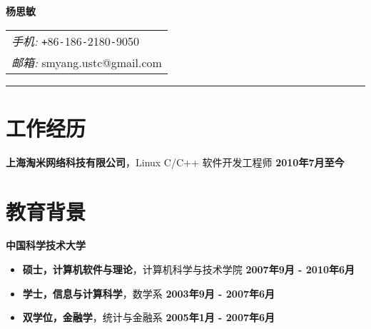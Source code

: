 \documentclass[margin]{res}
\newcommand{\ustc}{中国科学技术大学}
\newcommand{\taomee}{上海淘米网络科技有限公司}
\begin{document}
{\bfseries \huge 杨思敏}
\hfill
\begin{tabular}{l}
    \textit{手机: } \texttt{+}86\texttt{-}186\texttt{-}2180\texttt{-}9050\\
    \textit{邮箱: }{smyang.ustc@gmail.com}
\end{tabular}
\rule{\columnwidth}{1pt}

\section{工作经历}
{\bf \taomee}，Linux C/C++ 软件开发工程师 \hfill {\bf 2010年7月至今}\\[1mm]

\section{教育背景}
{\bf \ustc}\\[1mm]
\begin{itemize}
    \item {\bf 硕士，计算机软件与理论}，计算机科学与技术学院 \hfill {\bf 2007年9月 - 2010年6月}
    \item {\bf 学士，信息与计算科学}，数学系 \hfill{\bf 2003年9月 - 2007年6月}
    \item {\bf 双学位，金融学}，统计与金融系 \hfill {\bf 2005年1月 - 2007年6月}
\end{itemize}


\end{document}
